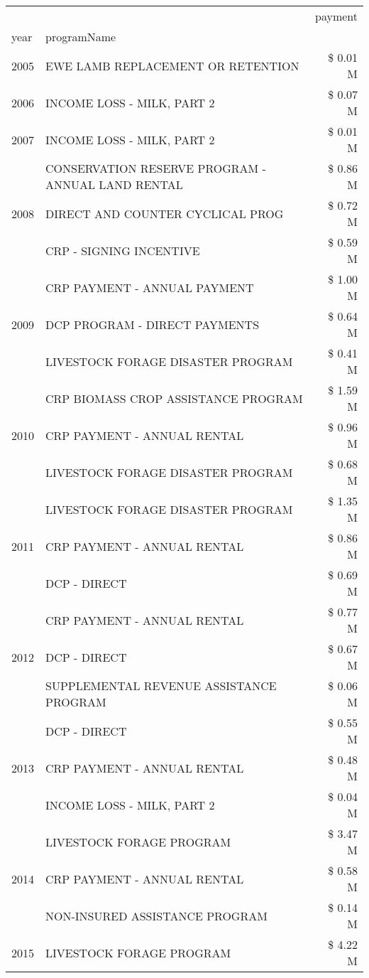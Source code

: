 \begin{tabular}{llr}
\toprule
 &  & payment \\
year & programName &  \\
\midrule
2005 & EWE LAMB REPLACEMENT OR RETENTION & \$ 0.01 M \\
\cline{1-3}
2006 & INCOME LOSS - MILK, PART 2 & \$ 0.07 M \\
\cline{1-3}
2007 & INCOME LOSS - MILK, PART 2 & \$ 0.01 M \\
\cline{1-3}
\multirow[t]{3}{*}{2008} & CONSERVATION RESERVE PROGRAM - ANNUAL LAND RENTAL & \$ 0.86 M \\
 & DIRECT AND COUNTER CYCLICAL PROG & \$ 0.72 M \\
 & CRP - SIGNING INCENTIVE & \$ 0.59 M \\
\cline{1-3}
\multirow[t]{3}{*}{2009} & CRP PAYMENT - ANNUAL PAYMENT & \$ 1.00 M \\
 & DCP PROGRAM - DIRECT PAYMENTS & \$ 0.64 M \\
 & LIVESTOCK FORAGE DISASTER  PROGRAM & \$ 0.41 M \\
\cline{1-3}
\multirow[t]{3}{*}{2010} & CRP BIOMASS CROP ASSISTANCE PROGRAM & \$ 1.59 M \\
 & CRP PAYMENT - ANNUAL RENTAL & \$ 0.96 M \\
 & LIVESTOCK FORAGE DISASTER PROGRAM & \$ 0.68 M \\
\cline{1-3}
\multirow[t]{3}{*}{2011} & LIVESTOCK FORAGE DISASTER PROGRAM & \$ 1.35 M \\
 & CRP PAYMENT - ANNUAL RENTAL & \$ 0.86 M \\
 & DCP - DIRECT & \$ 0.69 M \\
\cline{1-3}
\multirow[t]{3}{*}{2012} & CRP PAYMENT - ANNUAL RENTAL & \$ 0.77 M \\
 & DCP - DIRECT & \$ 0.67 M \\
 & SUPPLEMENTAL REVENUE ASSISTANCE PROGRAM & \$ 0.06 M \\
\cline{1-3}
\multirow[t]{3}{*}{2013} & DCP - DIRECT & \$ 0.55 M \\
 & CRP PAYMENT - ANNUAL RENTAL & \$ 0.48 M \\
 & INCOME LOSS - MILK, PART 2 & \$ 0.04 M \\
\cline{1-3}
\multirow[t]{3}{*}{2014} & LIVESTOCK FORAGE PROGRAM & \$ 3.47 M \\
 & CRP PAYMENT - ANNUAL RENTAL & \$ 0.58 M \\
 & NON-INSURED ASSISTANCE PROGRAM & \$ 0.14 M \\
\cline{1-3}
\multirow[t]{3}{*}{2015} & LIVESTOCK FORAGE PROGRAM & \$ 4.22 M \\

\end{tabular}
